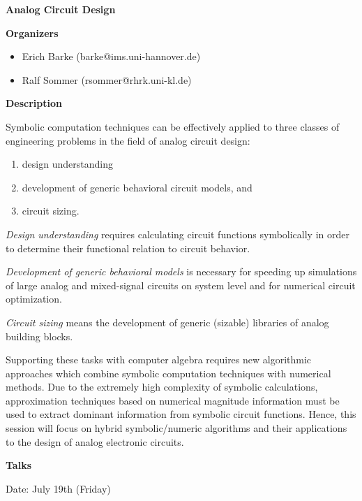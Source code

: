 \begin{center}
{\LARGE \bf Analog Circuit Design}
\end{center}
\bigskip

{\bf Organizers}

\begin{itemize}

\item 
Erich Barke (barke@ims.uni-hannover.de)
\item
Ralf Sommer (rsommer@rhrk.uni-kl.de)
\end{itemize}

\medskip

\bigskip

{\bf Description}

\medskip
Symbolic computation techniques can be effectively applied to three classes of engineering
problems in the field of analog circuit design: 

\begin{enumerate}
\item
design understanding
\item
development of generic behavioral circuit models, and 

\item
circuit sizing.
\end{enumerate}

{\em Design understanding} requires calculating circuit functions symbolically in order to determine
their functional relation to circuit behavior. 

{\em Development of generic behavioral models} is necessary for speeding up simulations of large analog
and mixed-signal circuits on system level and for numerical circuit optimization. 

{\em Circuit sizing} means the development of generic (sizable) libraries of analog building blocks. 

Supporting these tasks with computer algebra requires new algorithmic approaches which combine
symbolic computation techniques with numerical methods. Due to the extremely high complexity
of symbolic calculations, approximation techniques based on numerical magnitude information
must be used to extract dominant information from symbolic circuit functions. Hence, this session
will focus on hybrid symbolic/numeric algorithms and their applications to the design of analog
electronic circuits. 


\bigskip
{\bf Talks}
\medskip

Date: July 19th (Friday) 

